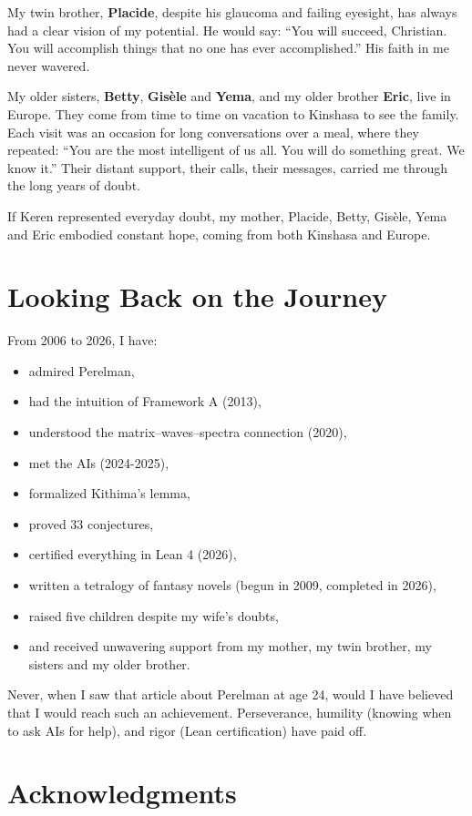 \documentclass[11pt,a4paper]{article}
\begin{document}
My twin brother, \textbf{Placide}, despite his glaucoma and failing eyesight, has always had a clear vision of my potential. He would say: ``You will succeed, Christian. You will accomplish things that no one has ever accomplished.'' His faith in me never wavered.

My older sisters, \textbf{Betty}, \textbf{Gisèle} and \textbf{Yema}, and my older brother \textbf{Eric}, live in Europe. They come from time to time on vacation to Kinshasa to see the family. Each visit was an occasion for long conversations over a meal, where they repeated: ``You are the most intelligent of us all. You will do something great. We know it.'' Their distant support, their calls, their messages, carried me through the long years of doubt.

If Keren represented everyday doubt, my mother, Placide, Betty, Gisèle, Yema and Eric embodied constant hope, coming from both Kinshasa and Europe.

\section{Looking Back on the Journey}

From 2006 to 2026, I have:
\begin{itemize}
\item admired Perelman,
\item had the intuition of Framework A (2013),
\item understood the matrix–waves–spectra connection (2020),
\item met the AIs (2024-2025),
\item formalized Kithima's lemma,
\item proved 33 conjectures,
\item certified everything in Lean 4 (2026),
\item written a tetralogy of fantasy novels (begun in 2009, completed in 2026),
\item raised five children despite my wife's doubts,
\item and received unwavering support from my mother, my twin brother, my sisters and my older brother.
\end{itemize}

Never, when I saw that article about Perelman at age 24, would I have believed that I would reach such an achievement. Perseverance, humility (knowing when to ask AIs for help), and rigor (Lean certification) have paid off.

\section{Acknowledgments}
\end{document}
